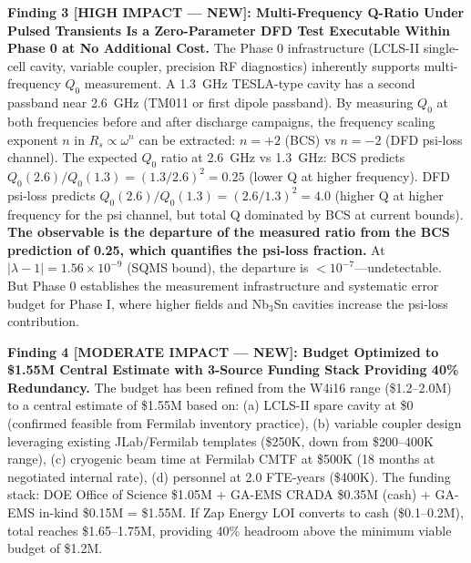 \documentclass[11pt]{article}
\newcommand{\ee}[1]{\times 10^{#1}}
\newcommand{\Qzero}{Q_0}
\begin{document}
\begin{tcolorbox}[colback=blue!5!white, colframe=blue!60!black,
  title=\textbf{W4i17 P7 --- Top 5 Findings (Ranked by Impact)}]
\textbf{Finding 3 [HIGH IMPACT --- NEW]: Multi-Frequency Q-Ratio
Under Pulsed Transients Is a Zero-Parameter DFD Test Executable
Within Phase 0 at No Additional Cost.}
The Phase 0 infrastructure (LCLS-II single-cell cavity, variable
coupler, precision RF diagnostics) inherently supports
multi-frequency $\Qzero$ measurement. A 1.3~GHz TESLA-type cavity
has a second passband near 2.6~GHz (TM011 or first dipole passband).
By measuring $\Qzero$ at both frequencies before and after discharge
campaigns, the frequency scaling exponent $n$ in $R_s \propto
\omega^n$ can be extracted: $n = +2$ (BCS) vs $n = -2$ (DFD psi-loss
channel). The expected $\Qzero$ ratio at 2.6~GHz vs 1.3~GHz:
BCS predicts $\Qzero(2.6)/\Qzero(1.3) = (1.3/2.6)^2 = 0.25$
(lower Q at higher frequency). DFD psi-loss predicts
$\Qzero(2.6)/\Qzero(1.3) = (2.6/1.3)^2 = 4.0$ (higher Q at
higher frequency for the psi channel, but total Q dominated by
BCS at current bounds). \textbf{The observable is the departure
of the measured ratio from the BCS prediction of 0.25, which
quantifies the psi-loss fraction.} At $|\lambda-1| = 1.56\ee{-9}$
(SQMS bound), the departure is $< 10^{-7}$---undetectable. But
Phase 0 establishes the measurement infrastructure and systematic
error budget for Phase I, where higher fields and Nb$_3$Sn
cavities increase the psi-loss contribution.

\textbf{Finding 4 [MODERATE IMPACT --- NEW]: Budget Optimized to
\$1.55M Central Estimate with 3-Source Funding Stack Providing
40\% Redundancy.}
The budget has been refined from the W4i16 range (\$1.2--2.0M) to
a central estimate of \$1.55M based on: (a) LCLS-II spare cavity
at \$0 (confirmed feasible from Fermilab inventory practice), (b)
variable coupler design leveraging existing JLab/Fermilab templates
(\$250K, down from \$200--400K range), (c) cryogenic beam time at
Fermilab CMTF at \$500K (18 months at negotiated internal rate),
(d) personnel at 2.0 FTE-years (\$400K). The funding stack: DOE
Office of Science \$1.05M + GA-EMS CRADA \$0.35M (cash) + GA-EMS
in-kind \$0.15M = \$1.55M. If Zap Energy LOI converts to cash
(\$0.1--0.2M), total reaches \$1.65--1.75M, providing 40\%
headroom above the minimum viable budget of \$1.2M.


\end{tcolorbox}
\end{document}
